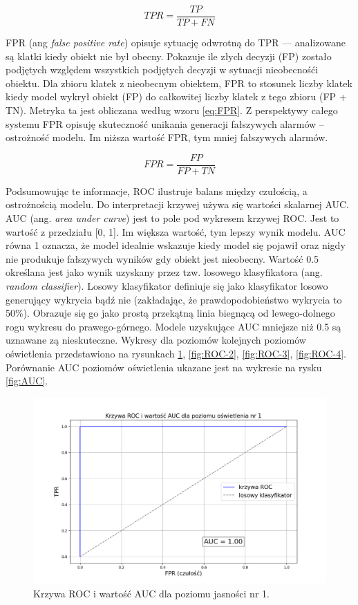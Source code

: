\begin{equation}
    TPR = \frac{TP}{TP + FN}
    \label{eq:TPR}
\end{equation}

FPR (ang \emph{false positive rate}) opisuje sytuację odwrotną do TPR --- analizowane są klatki kiedy obiekt nie był obecny. Pokazuje ile złych decyzji (FP) zostało podjętych względem wszystkich podjętych decyzji w sytuacji nieobecnośći obiektu. Dla zbioru klatek z nieobecnym obiektem, FPR to stosunek liczby klatek kiedy model wykrył obiekt (FP) do całkowitej liczby klatek z tego zbioru (FP + TN). Metryka ta jest obliczana według wzoru \ref{eq:FPR}. Z perspektywy całego systemu FPR opisuję skuteczność unikania generacji fałszywych alarmów -- ostrożność modelu. Im niższa wartość FPR, tym mniej fałszywych alarmów.


\begin{equation}
    FPR = \frac{FP}{FP + TN}
    \label{eq:FPR}
\end{equation}

Podsumowując te informacje, ROC ilustruje balans między czułością, a ostrożnością modelu. Do interpretacji krzywej używa się wartości skalarnej AUC. AUC (ang. \emph{area under curve}) jest to pole pod wykresem krzywej ROC. Jest to wartość z przedziału [0, 1]. Im większa wartość, tym lepszy wynik modelu. AUC równa 1 oznacza, że model idealnie wskazuje kiedy model się pojawił oraz nigdy nie produkuje fałszywych wyników gdy obiekt jest nieobecny. Wartość 0.5 określana jest jako wynik uzyskany przez tzw. losowego klasyfikatora (ang. \emph{random classifier}). Losowy klasyfikator definiuje się jako klasyfikator losowo generujący wykrycia bądź nie (zakładając, że prawdopodobieństwo wykrycia to 50\%). Obrazuje się go jako prostą przekątną linia biegnącą od lewego-dolnego rogu wykresu do prawego-górnego. Modele uzyskujące AUC mniejsze niż 0.5 są uznawane zą nieskuteczne. 
Wykresy dla poziomów kolejnych poziomów oświetlenia przedstawiono na rysunkach \ref{fig:ROC-1}, \ref{fig:ROC-2}, \ref{fig:ROC-3}, \ref{fig:ROC-4}. Porównanie AUC poziomów oświetlenia ukazane jest na wykresie na rysku \ref{fig:AUC}.



\begin{figure}[H]
    \centering
    \includegraphics[width=\linewidth]{r_test_dokładności/AUC_charts/1.png}
    \caption{Krzywa ROC i wartość AUC dla poziomu jasności nr 1.}
    \label{fig:ROC-1}
\end{figure}

